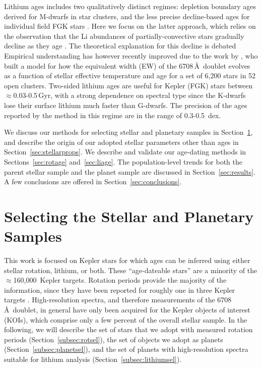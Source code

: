 \documentclass[11pt,twocolumn,tighten]{aastex63}
\newcommand{\nkeplerstars}{$\approx$160{,}000}
\begin{document}
Lithium ages includes two qualitatively distinct regimes: depletion
boundary ages derived for M-dwarfs in star clusters, and the less
precise decline-based ages for individual field FGK stars
\citep{Soderblom_2010}.  Here we focus on the latter approach, which
relies on the observation that the Li abundances of
partially-convective stars gradually decline as they age
\citep[e.g.][]{2005A&A...442..615S}.  The theoretical explanation for
this decline is debated
\citep[e.g.][]{1995ApJ...441..865C,2010ApJ...716.1269D,2019MNRAS.485.4052C}
Empirical understanding has however recently improved due to the work
by \citet{Jeffries_2023}, who built a model for how the equivalent
width (EW) of the  6708\,\AA\ doublet evolves as a function
of stellar effective temperature and age for a set of 6{,}200 stars in
52 open clusters.  Two-sided lithium ages are useful for Kepler (FGK)
stars between $\approx$0.03-0.5\,Gyr, with a strong dependence on
spectral type since the K-dwarfs lose their surface lithium much
faster than G-dwarfs.  The precision of the ages reported by the
\citet{Jeffries_2023} method in this regime are in the range of
0.3-0.5~dex.

We discuss our methods for selecting stellar and planetary samples in
Section~\ref{sec:selection}, and describe
the origin of our adopted stellar parameters other than ages in
Section~\ref{sec:stellarprops}.
We describe and validate our age-dating methods in
Sections~\ref{sec:rotage} and~\ref{sec:liage}.
The population-level trends for both the parent stellar sample and
the planet sample are discussed in Section~\ref{sec:results}.
A few conclusions are offered in Section~\ref{sec:conclusions}.


\section{Selecting the Stellar and Planetary Samples}
\label{sec:selection}

This work is focused on Kepler stars for which ages can be inferred
using either stellar rotation, lithium, or both.  These ``age-dateable
stars'' are a minority of the \nkeplerstars\ Kepler targets.  Rotation
periods provide the majority of the information, since they have been
reported for roughly one in three Kepler targets
\citep[e.g.][]{McQuillan_2014,Santos_2021}.  High-resolution spectra,
and therefore measurements of the  6708\,\AA\ doublet, in
general have only been acquired for the Kepler objects of interest
(KOIs), which comprise only a few percent of the overall stellar
sample.  In the following, we will describe the set of stars that we
adopt with measured rotation periods (Section~\ref{subsec:rotsel}),
the set of objects we adopt as planets
(Section~\ref{subsec:planetsel}), and the set of planets with
high-resolution spectra suitable for lithium analysis
(Section~\ref{subsec:lithiumsel}).
\end{document}
